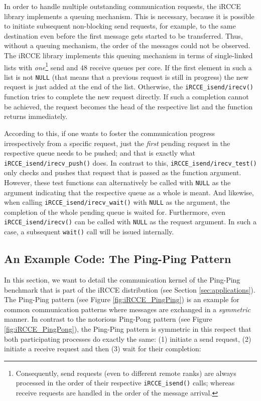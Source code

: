 \documentclass[fontsize=10pt, paper=a4, DIV12, pagesize=auto]{scrartcl}
\begin{document}
In order to handle multiple outstanding communication requests, the iRCCE library implements a queuing mechanism.
This is necessary, because it is possible to initiate subsequent non-blocking send requests, for example, to the same destination even before the first message gets started to be transferred.
Thus, without a queuing mechanism, the order of the messages could not be observed.
The iRCCE library implements this queuing mechanism in terms of single-linked lists with \emph{one}\footnote{Consequently, send requests (even to different remote ranks) are always processed in the order of their respective \texttt{iRCCE\_isend()} calls; whereas receive requests are handled in the order of the message arrival.} send and 48 receive queues per core.
If the first element in such a list is not \texttt{NULL} (that means that a previous request is still in progress) the new request is just added at the end of the list.
Otherwise, the \texttt{iRCCE\_isend/irecv()} function tries to complete the new request directly.
If such a completion cannot be achieved, the request becomes the head of the respective list and the function returns immediately.

According to this, if one wants to foster the communication progress irrespectively from a specific request, just the \emph{first} pending request in the respective queue needs to be pushed; and that is exactly what \texttt{iRCCE\_isend/irecv\_push()} does.
In contrast to this, \texttt{iRCCE\_isend/irecv\_test()} only checks and pushes that request that is passed as the function argument.
However, these test functions can alternatively be called with \texttt{NULL} as the argument indicating that the respective queue as a whole is meant.
And likewise, when calling \texttt{iRCCE\_isend/irecv\_wait()} with \texttt{NULL} as the argument, the completion of the whole pending queue is waited for.
Furthermore, even \texttt{iRCCE\_isend/irecv()} can be called with \texttt{NULL} as the request argument.
In such a case, a subsequent \texttt{wait()} call will be issued internally.

\subsection{An Example Code: The Ping-Ping Pattern}\label{sec:pingping}

In this section, we want to detail the communication kernel of the Ping-Ping benchmark that is part of the iRCCE distribution (see Section \ref{sec:applications}).
The Ping-Ping pattern (see Figure \ref{fig:iRCCE_PingPing}) is an example for common communication patterns where messages are exchanged in a \emph{symmetric} manner.
In contrast to the notorious Ping-Pong pattern (see Figure \ref{fig:iRCCE_PingPong}), the Ping-Ping pattern is symmetric in this respect that both participating processes do exactly the same: (1) initiate a send request, (2) initiate a receive request and then (3) wait for their completion:
\end{document}
